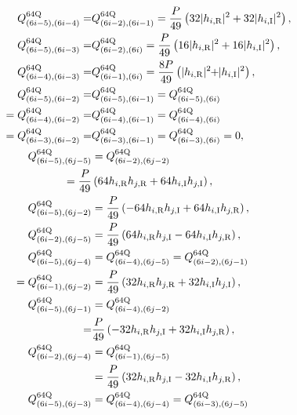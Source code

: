 {\allowdisplaybreaks
\begin{align}
	Q_{(6i-5),(6i-4)}^{64{\rm Q}} =& Q_{(6i-2),(6i-1)}^{64{\rm Q}} = \frac{P}{49} \left( 32 |h_{i,{\rm R}}|^2 + 32 |h_{i,{\rm I}}|^2 \right), \\
	Q_{(6i-5),(6i-3)}^{64{\rm Q}} =& Q_{(6i-2),(6i)}^{64{\rm Q}} = \frac{P}{49} \left( 16 |h_{i,{\rm R}}|^2 + 16 |h_{i,{\rm I}}|^2 \right), \\
	Q_{(6i-4),(6i-3)}^{64{\rm Q}} =& Q_{(6i-1),(6i)}^{64{\rm Q}} = \frac{8 P}{49} \left( |h_{i,{\rm R}}|^2 \hspace{-0.1cm} +\hspace{-0.1cm}|h_{i,{\rm I}}|^2 \right), \\
	Q_{(6i-5),(6i-2)}^{64{\rm Q}} =& Q_{(6i-5),(6i-1)}^{64{\rm Q}} = Q_{(6i-5),(6i)}^{64{\rm Q}} \nonumber \\
	= Q_{(6i-4),(6i-2)}^{64{\rm Q}} =& Q_{(6i-4),(6i-1)}^{64{\rm Q}} = Q_{(6i-4),(6i)}^{64{\rm Q}}  \nonumber \\
	= Q_{(6i-3),(6i-2)}^{64{\rm Q}} =& Q_{(6i-3),(6i-1)}^{64{\rm Q}} = Q_{(6i-3),(6i)}^{64{\rm Q}} = 0, \\
	Q_{(6i-5),(6j-5)}^{64{\rm Q}} &= Q_{(6i-2),(6j-2)}^{64{\rm Q}} \nonumber\\
	= \frac{P}{49} & \left( 64 h_{i,{\rm R}} h_{j,{\rm R}} + 64 h_{i,{\rm I}} h_{j,{\rm I}} \right), \\
	Q_{(6i-5),(6j-2)}^{64{\rm Q}} &= \frac{P}{49} \left( -64 h_{i,{\rm R}} h_{j,{\rm I}} + 64 h_{i,{\rm I}} h_{j,{\rm R}} \right), \\
	Q_{(6i-2),(6j-5)}^{64{\rm Q}} &= \frac{P}{49} \left(64 h_{i,{\rm R}} h_{j,{\rm I}} - 64 h_{i,{\rm I}} h_{j,{\rm R}} \right), \\
	Q_{(6i-5),(6j-4)}^{64{\rm Q}} &= Q_{(6i-4),(6j-5)}^{64{\rm Q}} = Q_{(6i-2),(6j-1)}^{64{\rm Q}} \nonumber\\
	= Q_{(6i-1),(6j-2)}^{64{\rm Q}} &= \frac{P}{49} \left(32 h_{i,{\rm R}} h_{j,{\rm R}} + 32 h_{i,{\rm I}} h_{j,{\rm I}} \right), \\
	Q_{(6i-5),(6j-1)}^{64{\rm Q}} &= Q_{(6i-4),(6j-2)}^{64{\rm Q}} \nonumber\\
	=& \frac{P}{49} \left( -32 h_{i,{\rm R}} h_{j,{\rm I}} + 32 h_{i,{\rm I}} h_{j,{\rm R}} \right), \\
	Q_{(6i-2),(6j-4)}^{64{\rm Q}} &= Q_{(6i-1),(6j-5)}^{64{\rm Q}} \nonumber\\
	&=\frac{P}{49} \left( 32 h_{i,{\rm R}} h_{j,{\rm I}} - 32 h_{i,{\rm I}} h_{j,{\rm R}} \right), \\
	Q_{(6i-5),(6j-3)}^{64{\rm Q}} &= Q_{(6i-4),(6j-4)}^{64{\rm Q}} = Q_{(6i-3),(6j-5)}^{64{\rm Q}} \nonumber\\

\end{align}}
